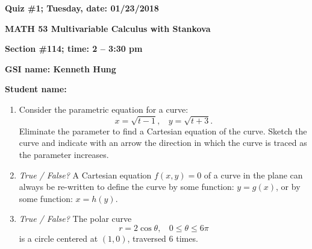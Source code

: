 \documentclass{article}
\begin{document}
{\bf Quiz \#1; Tuesday, date: 01/23/2018}

{\bf MATH 53 Multivariable Calculus with Stankova}

{\bf Section \#114; time: 2 -- 3:30 pm}

{\bf GSI name: Kenneth Hung}

{\bf Student name:}

\vspace*{0.25in}

\begin{enumerate}
\item Consider the parametric equation for a curve:
\[
x = \sqrt{t - 1}, ~~~~ y = \sqrt{t + 3}.
\]
Eliminate the parameter to find a Cartesian equation of the curve. Sketch the curve and indicate with an arrow the direction in which the curve is traced as the parameter increases.

\item {\em True / False?} A Cartesian equation $f(x, y) = 0$ of a curve in the plane can always be re-written to define the curve by some function: $y = g(x)$, or by some function: $x = h(y)$.

\item {\em True / False?} The polar curve
\[
r = 2 \cos \theta, ~~~~ 0 \le \theta \le 6 \pi
\]
is a circle centered at $(1, 0)$, traversed $6$ times.
\end{enumerate}
\end{document}

